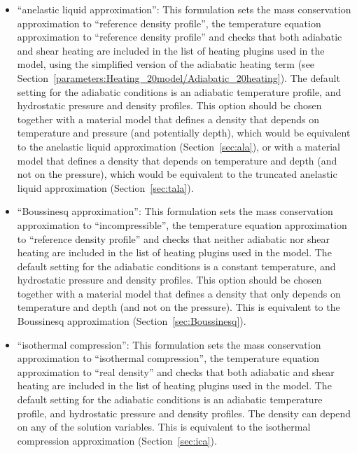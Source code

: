 \documentclass{article}
\begin{document}
\begin{itemize}
 \item 
``anelastic liquid approximation'': This formulation sets the mass conservation approximation to ``reference density profile'', 
the temperature equation approximation to ``reference density profile'' and checks that both
adiabatic and shear heating are included in the list of heating plugins used in the model, using the 
simplified version of the adiabatic heating term 
(see Section~\ref{parameters:Heating_20model/Adiabatic_20heating}).
The default setting for the adiabatic conditions is an adiabatic temperature profile, and hydrostatic
pressure and density profiles. This option should be chosen together with a material model 
that defines a density that depends on temperature and pressure (and potentially depth), 
which would be equivalent to the anelastic liquid approximation (Section~\ref{sec:ala}), 
or with a material model that defines a density that depends on temperature and depth 
(and not on the pressure), which would be equivalent to the truncated anelastic liquid approximation 
(Section~\ref{sec:tala}).

\item
``Boussinesq approximation'': This formulation sets the mass conservation approximation to ``incompressible'', 
the temperature equation approximation to ``reference density profile'' and checks that neither
adiabatic nor shear heating are included in the list of heating plugins used in the model. 
The default setting for the adiabatic conditions is a constant temperature, and hydrostatic
pressure and density profiles. This option should be chosen together with a material model 
that defines a density that only depends on temperature and depth (and not on the pressure).
This is equivalent to the Boussinesq approximation (Section~\ref{sec:Boussinesq}).

\item
``isothermal compression'': This formulation sets the mass conservation approximation to 
``isothermal compression'', the temperature equation approximation to ``real density''
and checks that both
adiabatic and shear heating are included in the list of heating plugins used in the model.
The default setting for the adiabatic conditions is an adiabatic temperature profile, and hydrostatic
pressure and density profiles. The density can depend on any of the solution variables. 
This is equivalent to the isothermal compression approximation (Section~\ref{sec:ica}).


\end{itemize}
\end{document}
